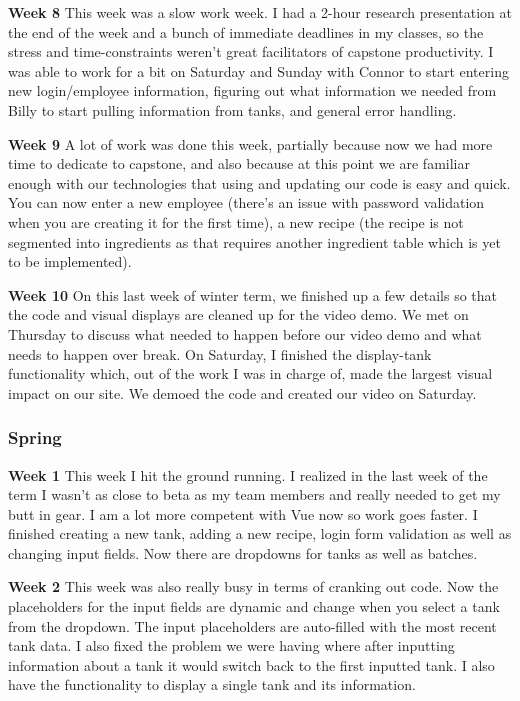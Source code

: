 \noindent\medskip\textbf{Week 8}
This week was a slow work week. I had a 2-hour research presentation at the end of the week and a bunch of immediate deadlines in my classes, so the stress and time-constraints weren’t great facilitators of capstone productivity.
I was able to work for a bit on Saturday and Sunday with Connor to start entering new login/employee information, figuring out what information we needed from Billy to start pulling information from tanks, and general error handling.

\noindent\medskip\textbf{Week 9}
A lot of work was done this week, partially because now we had more time to dedicate to capstone, and also because at this point we are familiar enough with our technologies that using and updating our code is easy and quick.
You can now enter a new employee (there's an issue with password validation when you are creating it for the first time), a new recipe (the recipe is not segmented into ingredients as that requires another ingredient table which is yet to be implemented).

\noindent\medskip\textbf{Week 10}
On this last week of winter term, we finished up a few details so that the code and visual displays are cleaned up for the video demo.
We met on Thursday to discuss what needed to happen before our video demo and what needs to happen over break.
On Saturday, I finished the display-tank functionality which, out of the work I was in charge of, made the largest visual impact on our site.
We demoed the code and created our video on Saturday.

\subsubsection{Spring}
\hfill\break
\noindent\medskip\textbf{Week 1}
This week I hit the ground running.
I realized in the last week of the term I wasn't as close to beta as my team members and really needed to get my butt in gear.
I am a lot more competent with Vue now so work goes faster.
I finished creating a new tank, adding a new recipe, login form validation as well as changing input fields.
Now there are dropdowns for tanks as well as batches.


\noindent\medskip\textbf{Week 2}
This week was also really busy in terms of cranking out code.
Now the placeholders for the input fields are dynamic and change when you select a tank from the dropdown.
The input placeholders are auto-filled with the most recent tank data.
I also fixed the problem we were having where after inputting information about a tank it would switch back to the first inputted tank.
I also have the functionality to display a single tank and its information.

